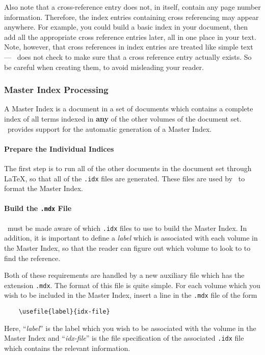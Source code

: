 Also note that a cross-reference entry does not, in itself, contain any
page number information.  Therefore, the index entries containing cross
referencing may appear anywhere.  For example, you could build a basic index
in your document, then add all the appropriate cross reference entries later,
all in one place in your text.  Note, however, that cross references in index
entries are treated like simple text --- \IdxTeX\ does not check to make sure
that a cross reference entry actually exists.  So be careful when creating them,
to avoid misleading your reader.

\subsubsection{Master Index Processing}

A Master Index 
is a document in a set of documents which contains a complete
index of all terms indexed in {\bf any} of the other volumes of the document
set.  \IdxTeX\ provides support for the automatic generation of a Master
Index.


\paragraph{Prepare the   Individual Indices}
The first step is to run all of the other documents in the document set 
through \LaTeX, so that all of the {\tt .idx} files are generated.  These
files are used by \IdxTeX\ to format the Master Index.

\paragraph{Build the {\tt .mdx} File}
\IdxTeX\ must be made aware of which {\tt .idx} files to use to build the
Master Index.  In addition, it is important to define a {\em label\/} which
is associated with each volume in the Master Index, so that the reader can
figure out which volume to look to to find the reference.

Both of these requirements are handled by a new auxiliary file which has the
extension {\tt \verb+.mdx+}.
The format of this file is quite simple.  For each volume which you wish to
be included in the Master Index, insert a line in the {\tt \verb+.mdx+} file of the
form
\begin{verbatim}
    \usefile{label}{idx-file}
\end{verbatim}
Here, ``{\em label\/}'' is the label which you wish to be associated with
the volume in the Master Index and ``{\em idx-file\/}'' is the file 
specification of the associated {\tt .idx} file which contains the relevant
information.

